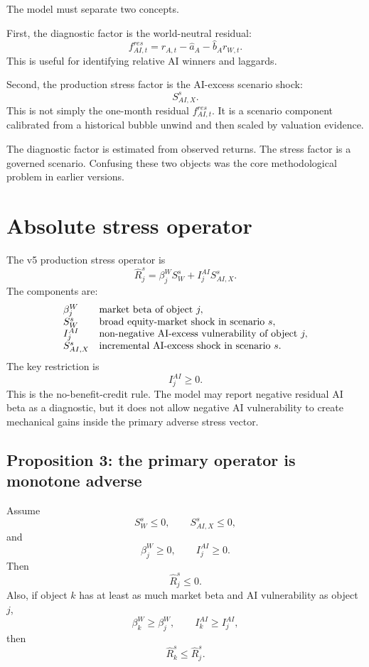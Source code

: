 \documentclass[11pt]{article}
\begin{document}
The model must separate two concepts.

First, the diagnostic factor is the world-neutral residual:
\[
f_{AI,t}^{res}=r_{A,t}-\widehat a_A-\widehat b_A r_{W,t}.
\]
This is useful for identifying relative AI winners and laggards.

Second, the production stress factor is the AI-excess scenario shock:
\[
S_{AI,X}^s.
\]
This is not simply the one-month residual $f_{AI,t}^{res}$. It is a scenario component calibrated from a historical bubble unwind and then scaled by valuation evidence.

The diagnostic factor is estimated from observed returns. The stress factor is a governed scenario. Confusing these two objects was the core methodological problem in earlier versions.

\section{Absolute stress operator}

The v5 production stress operator is
\[
\widehat R_j^s=\beta_j^W S_W^s+I_j^{AI}S_{AI,X}^s.
\]
The components are:
\[
\begin{array}{ll}
\beta_j^W & \hbox{market beta of object }j,\\
S_W^s & \hbox{broad equity-market shock in scenario }s,\\
I_j^{AI} & \hbox{non-negative AI-excess vulnerability of object }j,\\
S_{AI,X}^s & \hbox{incremental AI-excess shock in scenario }s.
\end{array}
\]
The key restriction is
\[
I_j^{AI}\geq 0.
\]
This is the no-benefit-credit rule. The model may report negative residual AI beta as a diagnostic, but it does not allow negative AI vulnerability to create mechanical gains inside the primary adverse stress vector.

\subsection*{Proposition 3: the primary operator is monotone adverse}

Assume
\[
S_W^s\leq 0,\qquad S_{AI,X}^s\leq 0,
\]
and
\[
\beta_j^W\geq 0,
\qquad I_j^{AI}\geq 0.
\]
Then
\[
\widehat R_j^s\leq 0.
\]
Also, if object $k$ has at least as much market beta and AI vulnerability as object $j$,
\[
\beta_k^W\geq \beta_j^W,
\qquad I_k^{AI}\geq I_j^{AI},
\]
then
\[
\widehat R_k^s\leq \widehat R_j^s.
\]
\end{document}
